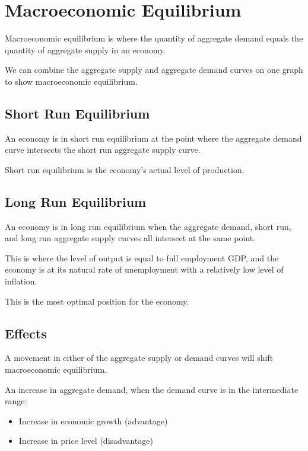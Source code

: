 \documentclass[a4paper,11pt]{report}
\begin{document}
\section{Macroeconomic Equilibrium}

Macroeconomic equilibrium is where the quantity of aggregate demand equals the
quantity of aggregate supply in an economy.

We can combine the aggregate supply and aggregate demand curves on one graph to
show macroeconomic equilibrium.


\subsection{Short Run Equilibrium}


An economy is in short run equilibrium at the point where the aggregate demand
curve intersects the short run aggregate supply curve.

Short run equilibrium is the economy's actual level of production.

\subsection{Long Run Equilibrium}


An economy is in long run equilibrium when the aggregate demand, short
run, and long run aggregate supply curves all intersect at the same point.

This is where the level of output is equal to full employment GDP, and the
economy is at its natural rate of unemployment with a relatively low level of
inflation.

This is the most optimal position for the economy.

\subsection{Effects}

A movement in either of the aggregate supply or demand curves will shift
macroeconomic equilibrium.

An increase in aggregate demand, when the demand curve is in the intermediate
range:

\begin{itemize}
\item Increase in economic growth (advantage)
\item Increase in price level (disadvantage)
\end{itemize}
\end{document}
